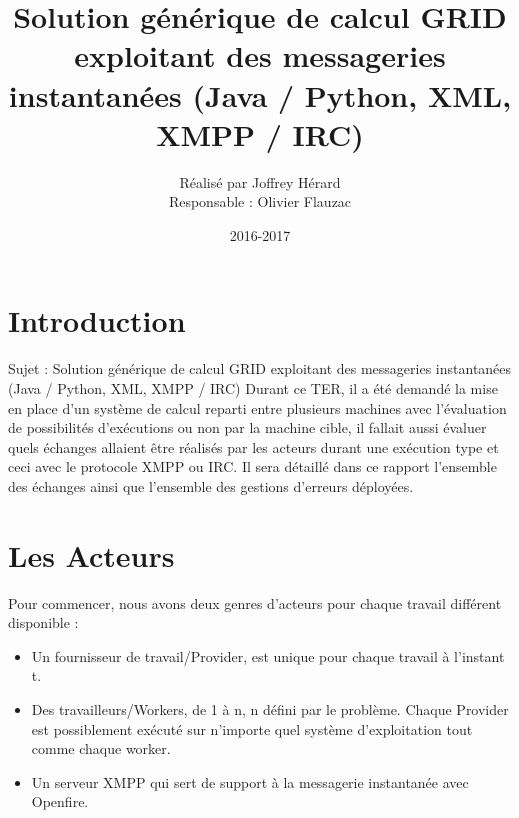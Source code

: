 \documentclass[11pt]{article}
\begin{document}
 \makeatletter
\def\maketitle{%
  \null
  \thispagestyle{empty}%
  \vfill
  \begin{center}\leavevmode
    \normalfont
    {\Huge \@title\par}%
    \vskip 3cm
    {\Large \@author\par}%
    \vskip 1cm
    {\Large \@date\par}%
  \end{center}%
  \vfill
  \null
  \cleardoublepage
  }
\makeatother
\title{Solution générique de calcul GRID exploitant des messageries instantanées
(Java / Python, XML, XMPP / IRC)}
\author{ Réalisé par Joffrey Hérard \begin{center}Responsable : Olivier Flauzac\end{center}}
\date{2016-2017}
\maketitle
 
\tableofcontents 

\newpage
\section{Introduction} 
Sujet : Solution générique de calcul GRID exploitant des messageries instantanées
(Java / Python, XML, XMPP / IRC)
Durant ce TER, il a été demandé la mise en place d'un système de calcul reparti entre plusieurs machines avec l'évaluation de possibilités d'exécutions ou non par la machine cible, il fallait aussi évaluer quels échanges allaient être réalisés par les acteurs durant une exécution type et ceci avec le protocole XMPP ou IRC. Il sera détaillé dans ce rapport l'ensemble des échanges ainsi que l'ensemble des gestions d'erreurs déployées. 

\section{Les Acteurs} 
Pour commencer, nous avons deux genres d'acteurs pour chaque travail différent disponible :
\begin{itemize}
\item Un fournisseur de travail/Provider, est unique pour chaque travail à l'instant t.
\item Des travailleurs/Workers, de 1 à n, n défini par le problème.
Chaque Provider est possiblement exécuté sur n'importe quel système d'exploitation  tout comme chaque worker.
\item Un serveur XMPP qui sert de support à la messagerie instantanée avec Openfire.
\end{itemize}
\newpage
\end{document}
